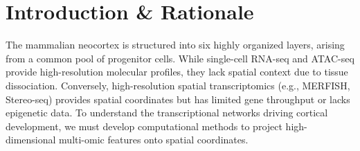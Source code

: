 \section{Introduction \& Rationale}
The mammalian neocortex is structured into six highly organized layers, arising from a common pool of progenitor cells. While single-cell RNA-seq and ATAC-seq provide high-resolution molecular profiles, they lack spatial context due to tissue dissociation. Conversely, high-resolution spatial transcriptomics (e.g., MERFISH, Stereo-seq) provides spatial coordinates but has limited gene throughput or lacks epigenetic data. To understand the transcriptional networks driving cortical development, we must develop computational methods to project high-dimensional multi-omic features onto spatial coordinates.
